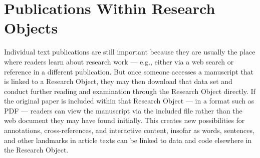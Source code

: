 
\section{Publications Within Research Objects}\fbeg{}\begin{frame}{}


\hspace*{15pt}\begin{ftxt}[.82\textwidth]

Individual text publications are still important because they are usually the 
place where readers learn about research work --- e.g., either via a web search 
or reference in a different publication.  But once someone accesses a 
manuscript that is linked to a Research Object, they may then 
download that data set and conduct further reading and examination 
through the Research Object directly.  If the original paper is 
included within that Research Object --- in a format such as 
PDF --- readers can view the manuscript via the included file 
rather than the web document they may have found initially.   
This creates new possibilities for annotations, cross-references, 
and interactive content, insofar as words, sentences, and 
other landmarks in article texts can be linked to 
data and code elsewhere in the Research Object.

\end{ftxt}


\end{frame}

